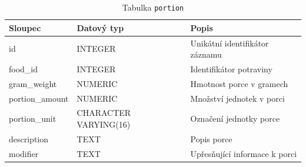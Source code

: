 \begin{table}[ht!]
    \centering
    \begin{tabularx}{\textwidth}{|l|l|L|}
        \hline
        \textbf{Sloupec} & \textbf{Datový typ}   & \textbf{Popis}                 \\ \hline
        id               & INTEGER               & Unikátní identifikátor záznamu \\ \hline
        food\_id         & INTEGER               & Identifikátor potraviny        \\ \hline
        gram\_weight     & NUMERIC               & Hmotnost porce v gramech       \\ \hline
        portion\_amount  & NUMERIC               & Množství jednotek v porci      \\ \hline
        portion\_unit    & CHARACTER VARYING(16) & Označení jednotky porce        \\ \hline
        description      & TEXT                  & Popis porce                    \\ \hline
        modifier         & TEXT                  & Upřesňující informace k porci  \\ \hline
    \end{tabularx}
    \caption{Tabulka \texttt{portion}}
    \label{tab:portion}
\end{table}
